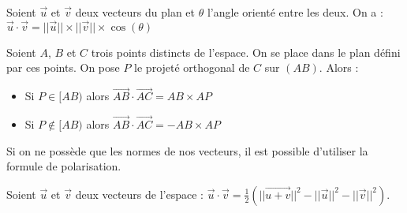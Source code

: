 	\begin{formula}
		Soient $\overrightarrow{u}$ et $\overrightarrow{v}$ deux vecteurs du plan et $\theta$ l'angle orienté entre les deux. On a :
		\newpar
		$\overrightarrow{u} \cdot \overrightarrow{v} = ||\overrightarrow{u}|| \times ||\overrightarrow{v}|| \times \cos(\theta)$
	\end{formula}
	
	\begin{formula}
		Soient $A$, $B$ et $C$ trois points distincts de l'espace. On se place dans le plan défini par ces points. On pose $P$ le projeté orthogonal de $C$ sur $(AB)$. Alors :
		\begin{itemize}
			\item Si $P \in [AB)$ alors $\overrightarrow{AB} \cdot \overrightarrow{AC} = AB \times AP$
			\item Si $P \notin [AB)$ alors $\overrightarrow{AB} \cdot \overrightarrow{AC} = - AB \times AP$
		\end{itemize}
	\end{formula}
	
	Si on ne possède que les normes de nos vecteurs, il est possible d'utiliser la formule de polarisation.
	
	\begin{formula}
		Soient $\overrightarrow{u}$ et $\overrightarrow{v}$ deux vecteurs de l'espace :
		$\overrightarrow{u} \cdot \overrightarrow{v} = \displaystyle{\frac{1}{2} \left(||\overrightarrow{u + v}||^2 - ||\overrightarrow{u}||^2 - ||\overrightarrow{v}||^2\right)}$.
	\end{formula}
	
